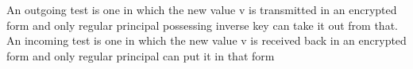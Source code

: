 \documentclass[12pt]{report}
\begin{document}
\clearpage
\tableofcontents

\listoffigures
\listoftables

\clearpage

\setcounter{page}{1}









An outgoing test is one in which the new value v is transmitted in an encrypted form and only regular principal possessing inverse key can take it out from that. An incoming test is one in which the new value v is received back in an encrypted form and only regular principal can put it in that form
\end{document}
